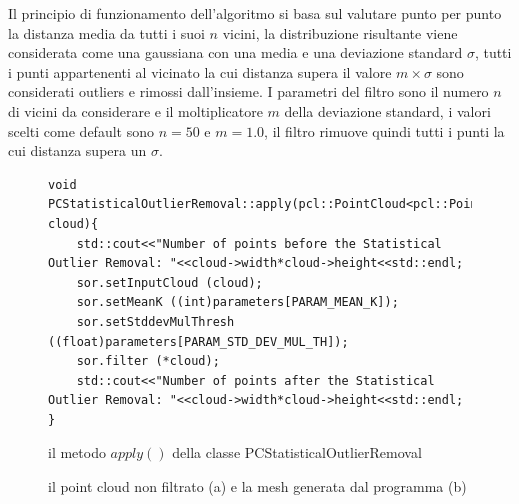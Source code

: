 \documentclass[a4paper,12pt]{article}
\begin{document}
		Il principio di funzionamento dell'algoritmo si basa sul valutare punto per punto la distanza media da tutti i suoi $n$
		vicini, la distribuzione risultante viene considerata come una gaussiana con una media e una deviazione standard
		$\sigma$, tutti i punti appartenenti al vicinato la cui distanza supera il valore $m\times\sigma$ sono considerati
		outliers e rimossi dall'insieme. 
		I parametri del filtro sono il numero $n$ di vicini da considerare e il moltiplicatore $m$ della deviazione standard, 
		i valori scelti come default sono $n=50$ e $m=1.0$, il filtro rimuove quindi tutti i punti la cui
		distanza supera un $\sigma$.
		\begin{figure}
		\begin{lstlisting}
void PCStatisticalOutlierRemoval::apply(pcl::PointCloud<pcl::PointXYZ>::Ptr cloud){
    std::cout<<"Number of points before the Statistical Outlier Removal: "<<cloud->width*cloud->height<<std::endl;
    sor.setInputCloud (cloud);
    sor.setMeanK ((int)parameters[PARAM_MEAN_K]);
    sor.setStddevMulThresh ((float)parameters[PARAM_STD_DEV_MUL_TH]);
    sor.filter (*cloud);
    std::cout<<"Number of points after the Statistical Outlier Removal: "<<cloud->width*cloud->height<<std::endl;
}
		\end{lstlisting}
		\caption{il metodo $apply()$ della classe PCStatisticalOutlierRemoval}
		\label{apply_sor}
		\end{figure}
		
		\begin{figure}[H]
    	\centering
    	\caption{il point cloud non filtrato (a) e la mesh generata dal programma (b)}
    	\label{fig:noise_comparison}
		\end{figure}
	\clearpage
\end{document}
